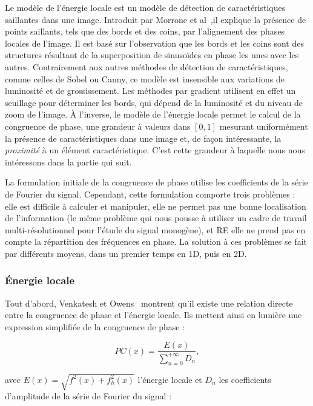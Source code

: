 Le modèle de l'énergie locale est un modèle de détection de caractéristiques saillantes dans une image. Introduit par Morrone et al~\cite{morrone_mach_1986, morrone_feature_1987},il explique la présence de points saillants, tels que des bords et des coins, par l'alignement des phases locales de l'image. Il est basé sur l'observation que les bords et les coins sont des structures résultant de la superposition de sinusoïdes en phase les unes avec les autres. Contrairement aux autres méthodes de détection de caractéristiques, comme celles de Sobel ou Canny, ce modèle est insensible aux variations de luminosité et de grossissement. Les méthodes par gradient utilisent en effet un seuillage pour déterminer les bords, qui dépend de la luminosité et du niveau de zoom de l'image. À l'inverse, le modèle de l'énergie locale permet le calcul de la congruence de phase, une grandeur à valeurs dans $[0, 1]$ mesurant uniformément la présence de caractéristiques dans une image et, de façon intéressante, la \textit{proximité} à un élément caractéristique. C'est cette grandeur à laquelle nous nous intéressons dans la partie qui suit.

\bigskip

La formulation initiale de la congruence de phase utilise les coefficients de la série de Fourier du signal. Cependant, cette formulation comporte trois problèmes : elle est difficile à calculer et manipuler, elle ne permet pas une bonne localisation de l'information (le même problème qui nous pousse à utiliser un cadre de travail multi-résolutionnel pour l'étude du signal monogène), et RE elle ne prend pas en compte la répartition des fréquences en phase. La solution à ces problèmes se fait par différents moyens, dans un premier temps en 1D, puis en 2D.

\subsubsection{Énergie locale}

Tout d'abord, Venkatesh et Owens~\cite{venkatesh_energy_1989} montrent qu'il existe une relation directe entre la congruence de phase et l'énergie locale. Ils mettent ainsi en lumière une expression simplifiée de la congruence de phase :

\begin{equation}
    PC(x) = \frac{E(x)}{\sum_{n=0}^{+\infty} D_n},
\end{equation}

avec $E(x) = \sqrt{f^2(x) + f_h^2(x)}$ l'énergie locale et $D_n$ les coefficients d'amplitude de la série de Fourier du signal :

